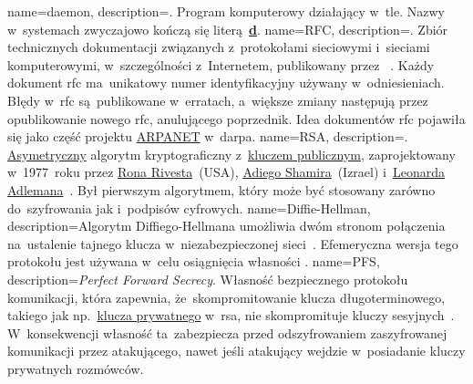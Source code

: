 {
	name={daemon},
	description={. Program komputerowy działający w~tle. Nazwy  w~systemach  zwyczajowo kończą się literą~\href{https://unix.stackexchange.com/questions/72587/why-do-some-linux-files-have-a-d-suffix}{\textbf{d}}.}
}
{
	name={RFC},
	description={. Zbiór technicznych dokumentacji związanych z~protokołami sieciowymi i~sieciami komputerowymi, w~szczególności z~Internetem, publikowany przez ~\cite{rfc-editor}. Każdy dokument \gls{rfc} ma~unikatowy numer identyfikacyjny używany w~odniesieniach. Błędy w~\gls{rfc} są~publikowane w~erratach, a~większe zmiany następują przez opublikowanie nowego \gls{rfc}, anulującego poprzednik. Idea dokumentów \gls{rfc} pojawiła się jako część projektu \href{https://en.wikipedia.org/wiki/ARPANET}{ARPANET} w~\gls{darpa}.}
}
{
	name={RSA},
	description={. \href{https://en.wikipedia.org/wiki/Public-key_cryptography}{Asymetryczny} algorytm kryptograficzny z~\href{https://en.wikipedia.org/wiki/Public-key_cryptography}{kluczem publicznym}, zaprojektowany w~1977~roku przez \href{https://en.wikipedia.org/wiki/Ron_Rivest}{Rona Rivesta}~(USA), \href{https://en.wikipedia.org/wiki/Adi_Shamir}{Adiego Shamira}~(Izrael) i~\href{https://en.wikipedia.org/wiki/Leonard_Adleman}{Leonarda Adlemana}~\cite{wiki:rsa,rsa}. Był pierwszym algorytmem, który może być stosowany zarówno do~szyfrowania jak i~podpisów cyfrowych.}
}
{
	name={Diffie-Hellman},
	description={Algorytm Diffiego-Hellmana umożliwia dwóm stronom połączenia na~ustalenie tajnego klucza w~niezabezpieczonej sieci~\cite{mimuw-ssl-w04}. Efemeryczna wersja tego protokołu jest używana w~celu osiągnięcia własności .}
}
{
	name={PFS},
	description={\emph{Perfect Forward Secrecy}. Własność bezpiecznego protokołu komunikacji, która zapewnia, że~skompromitowanie klucza długoterminowego, takiego jak np.~\href{https://en.wikipedia.org/wiki/Public-key_cryptography}{klucza prywatnego} w~\gls{rsa}, nie skompromituje kluczy sesyjnych~\cite{wiki:pfs}. W~konsekwencji własność ta~zabezpiecza przed odszyfrowaniem zaszyfrowanej komunikacji przez atakującego, nawet jeśli atakujący wejdzie w~posiadanie kluczy prywatnych rozmówców.}
}
